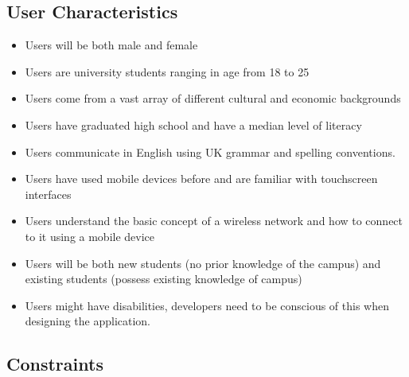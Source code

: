 \documentclass[a4paper,12pt]{article}
\begin{document}
	\subsection{User Characteristics}
		\begin{itemize}
			\small
			\item Users will be both male and female
			\item Users are university students ranging in age from 18 to 25
			\item Users come from a vast array of different cultural and economic backgrounds
			\item Users have graduated high school and have a median level of literacy
			\item Users communicate in English using UK grammar and spelling conventions.
			\item Users have used mobile devices before and are familiar with touchscreen interfaces
			\item Users understand the basic concept of a wireless network and how to connect to it using a mobile device
			\item Users will be both new students (no prior knowledge of the campus) and existing students (possess existing knowledge of campus)
			\item Users might have disabilities, developers need to be conscious of this when designing the application. 
		\end{itemize}
	\subsection{Constraints}
\end{document}
